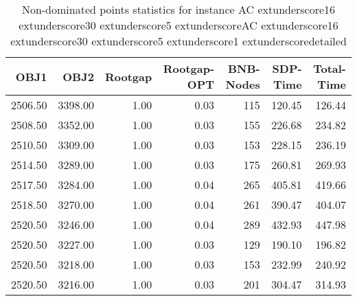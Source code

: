 \begin{table}
\caption{Non-dominated points statistics for instance AC	extunderscore16	extunderscore30	extunderscore5	extunderscoreAC	extunderscore16	extunderscore30	extunderscore5	extunderscore1	extunderscoredetailed}
\label{tab:stats/AC_16_30_5_AC_16_30_5_1_detailed}
\begin{tabular}{rrrrrrr}
\toprule
OBJ1 & OBJ2 & Rootgap & Rootgap-OPT & BNB-Nodes & SDP-Time & Total-Time \\
\midrule
2506.50 & 3398.00 & 1.00 & 0.03 & 115 & 120.45 & 126.44 \\
2508.50 & 3352.00 & 1.00 & 0.03 & 155 & 226.68 & 234.82 \\
2510.50 & 3309.00 & 1.00 & 0.03 & 153 & 228.15 & 236.19 \\
2514.50 & 3289.00 & 1.00 & 0.03 & 175 & 260.81 & 269.93 \\
2517.50 & 3284.00 & 1.00 & 0.04 & 265 & 405.81 & 419.66 \\
2518.50 & 3270.00 & 1.00 & 0.04 & 261 & 390.47 & 404.07 \\
2520.50 & 3246.00 & 1.00 & 0.04 & 289 & 432.93 & 447.98 \\
2520.50 & 3227.00 & 1.00 & 0.03 & 129 & 190.10 & 196.82 \\
2520.50 & 3218.00 & 1.00 & 0.03 & 153 & 232.99 & 240.92 \\
2520.50 & 3216.00 & 1.00 & 0.03 & 201 & 304.47 & 314.93 \\
\bottomrule
\end{tabular}
\end{table}
